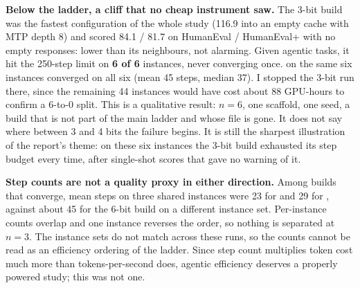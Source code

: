 \textbf{Below the ladder, a cliff that no cheap instrument saw.} The 3-bit build \Qthree{} was the
fastest configuration of the whole study (116.9\tps{} into an empty cache with MTP depth 8) and scored
84.1 / 81.7 on HumanEval / HumanEval+ with no empty responses: lower than its neighbours, not
alarming. Given agentic tasks, it hit the 250-step limit on \textbf{6 of 6} instances, never converging
once. \Qsix{} on the same six instances converged on all six (mean 45 steps, median 37). I stopped the
3-bit run there, since the remaining 44 instances would have cost about 88 GPU-hours to confirm a
6-to-0 split. This is a qualitative result: $n=6$, one scaffold, one seed, a build that is not part of
the main ladder and whose file is gone. It does not say where between 3 and 4 bits the failure begins.
It is still the sharpest illustration of the report's theme: on these six instances the 3-bit build
exhausted its step budget every time, after single-shot scores that gave no warning of it.

\textbf{Step counts are not a quality proxy in either direction.} Among builds that converge, mean
steps on three shared instances were 23 for \IQfour{} and 29 for \Qfive, against about 45 for the
6-bit build on a different instance set. Per-instance counts overlap and one instance reverses the
order, so nothing is separated at $n=3$. The instance sets do not match across these runs, so the counts cannot be read as an efficiency
ordering of the ladder. Since step count multiplies token cost much more than tokens-per-second does, agentic
efficiency deserves a properly powered study; this was not one.
